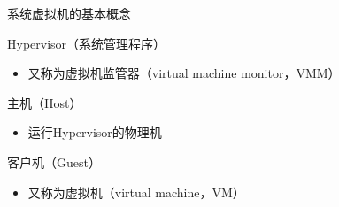 \begin{frame}{系统虚拟机的基本概念}
\begin{block}{Hypervisor（系统管理程序）}
  \begin{itemize}
    \item  又称为虚拟机监管器（virtual machine monitor，VMM）
  \end{itemize}
\end{block}

\begin{block}{主机（Host）}
  \begin{itemize}
    \item  运行Hypervisor的物理机
  \end{itemize}
\end{block}

\begin{block}{客户机（Guest）}
  \begin{itemize}
    \item  又称为虚拟机（virtual machine，VM）
  \end{itemize}
\end{block}
\end{frame}

